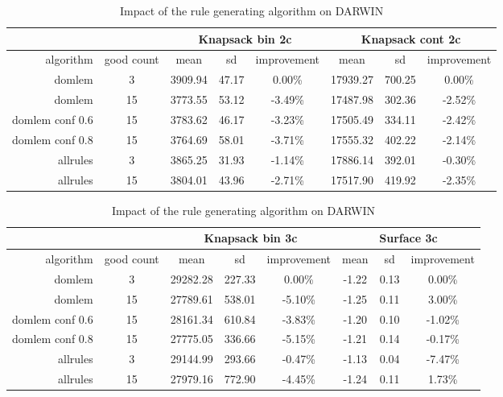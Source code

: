 \begin{table}[htb]
  \centering
  \begin{tabular}{r c c c c c c c}
    & & \multicolumn{3}{c}{Knapsack bin 2c} & \multicolumn{3}{c}{Knapsack cont 2c} \\
    \hline
    algorithm & good count & mean & sd & improvement & mean & sd & improvement \\
    \hline
    \hline
domlem & 3 & 3909.94 & 47.17 & 0.00\% & 17939.27 & 700.25 & 0.00\% \\
domlem & 15 & 3773.55 & 53.12 & -3.49\% & 17487.98 & 302.36 & -2.52\% \\
domlem conf 0.6 & 15 & 3783.62 & 46.17 & -3.23\% & 17505.49 & 334.11 & -2.42\% \\
domlem conf 0.8 & 15 & 3764.69 & 58.01 & -3.71\% & 17555.32 & 402.22 & -2.14\% \\
allrules & 3 & 3865.25 & 31.93 & -1.14\% & 17886.14 & 392.01 & -0.30\% \\
allrules & 15 & 3804.01 & 43.96 & -2.71\% & 17517.90 & 419.92 & -2.35\% \\
    \hline
  \end{tabular}
  \caption{Impact of the rule generating algorithm on DARWIN}
  \label{t:algo_1a}
\end{table}


\begin{table}[htb]
  \centering
  \begin{tabular}{r c c c c c c c}
    & & \multicolumn{3}{c}{Knapsack bin 3c} & \multicolumn{3}{c}{Surface 3c} \\
    \hline
    algorithm & good count & mean & sd & improvement & mean & sd & improvement \\
    \hline
    \hline
domlem & 3 & 29282.28 & 227.33 & 0.00\% & -1.22 & 0.13 & 0.00\% \\
domlem & 15 & 27789.61 & 538.01 & -5.10\% & -1.25 & 0.11 & 3.00\% \\
domlem conf 0.6 & 15 & 28161.34 & 610.84 & -3.83\% & -1.20 & 0.10 & -1.02\% \\
domlem conf 0.8 & 15 & 27775.05 & 336.66 & -5.15\% & -1.21 & 0.14 & -0.17\% \\
allrules & 3 & 29144.99 & 293.66 & -0.47\% & -1.13 & 0.04 & -7.47\% \\
allrules & 15 & 27979.16 & 772.90 & -4.45\% & -1.24 & 0.11 & 1.73\% \\
    \hline
  \end{tabular}
  \caption{Impact of the rule generating algorithm on DARWIN}
  \label{t:algo_1b}
\end{table}



